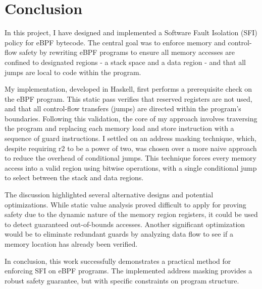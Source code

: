\section{Conclusion}\label{sec:conclusion}

In this project, I have designed and implemented a Software Fault Isolation
(SFI) policy for eBPF bytecode. The central goal was to enforce memory and
control-flow safety by rewriting eBPF programs to ensure all memory accesses
are confined to designated regions - a stack space and a data region - and that
all jumps are local to code within the program.

My implementation, developed in Haskell, first performs a prerequisite check on
the eBPF program. This static pass verifies that reserved registers are not
used, and that all control-flow transfers (jumps) are directed within the
program's boundaries. Following this validation, the core
of my approach involves traversing the program and replacing each memory load
and store instruction with a sequence of guard instructions. I settled on an
address masking technique, which, despite requiring r2 to be a power of two,
was chosen over a more naive approach to reduce the overhead of conditional
jumps. This technique forces every memory access into a valid region using
bitwise operations, with a single conditional jump to select between the stack
and data regions.

The discussion highlighted several alternative designs and potential
optimizations. While static value analysis proved difficult to apply for
proving safety due to the dynamic nature of the memory region registers, it
could be used to detect guaranteed out-of-bounds accesses. Another significant
optimization would be to eliminate redundant guards by analyzing data flow to
see if a memory location has already been verified.

In conclusion, this work successfully demonstrates a practical method for
enforcing SFI on eBPF programs. The implemented address masking provides a
robust safety guarantee, but with specific constraints on program structure.
